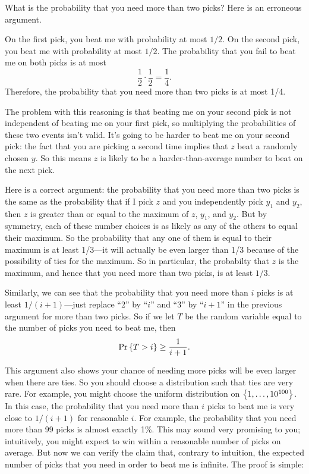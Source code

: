\documentclass[11pt,twoside]{article}
\begin{document}
What is the probability that you need more than two picks?  Here is an
erroneous argument.
\begin{falseproof}
On the first pick, you beat me with probability at most $1/2$.  On the
second pick, you beat me with probability at most $1/2$.  The probability
that you fail to beat me on both picks is at most
\[
\frac{1}{2} \cdot \frac{1}{2} = \frac{1}{4}.
\]
Therefore, the probability that you need more than two picks is at most
1/4.
\end{falseproof}

The problem with this reasoning is that beating me on your second pick is
not independent of beating me on your first pick, so multiplying the
probabilities of these two events isn't valid.  It's going to be harder to
beat me on your second pick: the fact that you are picking a second time
implies that $z$ beat a randomly chosen $y$.  So this means $z$ is likely
to be a harder-than-average number to beat on the next pick.

Here is a correct argument: the probability that you need more than two
picks is the same as the probability that if I pick $z$ and you
independently pick $y_1$ and $y_2$, then $z$ is greater than or equal to
the maximum of $z$, $y_1$, and $y_2$.  But by symmetry, each of these
number choices is as likely as any of the others to equal their maximum.
So the probability that any one of them is equal to their maximum is at
least 1/3---it will actually be even larger than 1/3 because of the
possibility of ties for the maximum.  So in particular, the probabilty
that $z$ is the maximum, and hence that you need more than two picks, is
at least $1/3$.

Similarly, we can see that the probability that you need more than $i$
picks is at least $1/(i+1)$---just replace ``2'' by ``$i$'' and ``3'' by
``$i+1$'' in the previous argument for more than two picks.  So if we let
$T$ be the random variable equal to the number of picks you need to beat
me, then
\begin{equation}\label{T>i}
\mathop{\textup{Pr}}\nolimits\left\{T > i\right\} \geq \frac{1}{i+1}.
\end{equation}

This argument also shows your chance of needing more picks will be even
larger when there are ties.  So you should choose a distribution such that
ties are very rare.  For example, you might choose the uniform
distribution on $\left\{1,\dots, 10^{100}\right\}$.  In this case, the probability
that you need more than $i$ picks to beat me is very close to $1/(i+1)$
for reasonable $i$.  For example, the probability that you need more than
99 picks is almost exactly 1\%.  This may sound very promising to you;
intuitively, you might expect to win within a reasonable number of picks
on average.  But now we can verify the claim that, contrary to intuition,
the expected number of picks that you need in order to beat me is
infinite.  The proof is simple:
\end{document}
